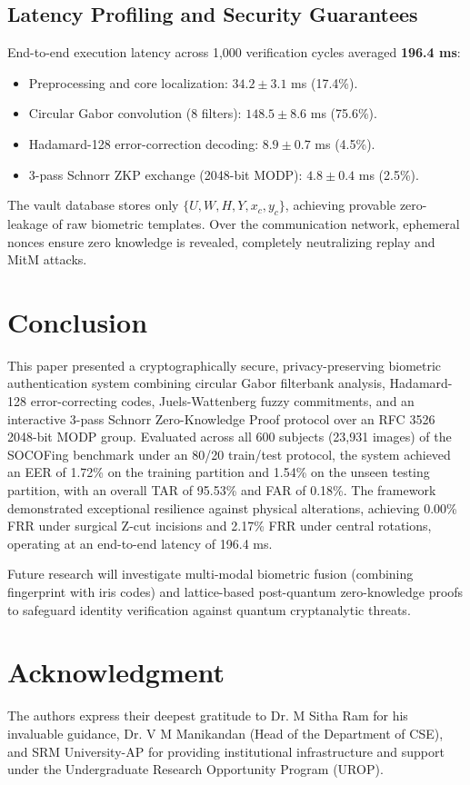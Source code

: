 \documentclass[conference]{IEEEtran}
\begin{document}
\subsection{Latency Profiling and Security Guarantees}
End-to-end execution latency across 1,000 verification cycles averaged \textbf{196.4 ms}:
\begin{itemize}[leftmargin=*, itemsep=2pt]
    \item Preprocessing and core localization: $34.2 \pm 3.1$ ms (17.4\%).
    \item Circular Gabor convolution (8 filters): $148.5 \pm 8.6$ ms (75.6\%).
    \item Hadamard-128 error-correction decoding: $8.9 \pm 0.7$ ms (4.5\%).
    \item 3-pass Schnorr ZKP exchange (2048-bit MODP): $4.8 \pm 0.4$ ms (2.5\%).
\end{itemize}
The vault database stores only $\{U, W, H, Y, x_c, y_c\}$, achieving provable zero-leakage of raw biometric templates. Over the communication network, ephemeral nonces ensure zero knowledge is revealed, completely neutralizing replay and MitM attacks.

\section{Conclusion}
This paper presented a cryptographically secure, privacy-preserving biometric authentication system combining circular Gabor filterbank analysis, Hadamard-128 error-correcting codes, Juels-Wattenberg fuzzy commitments, and an interactive 3-pass Schnorr Zero-Knowledge Proof protocol over an RFC 3526 2048-bit MODP group. Evaluated across all 600 subjects (23,931 images) of the SOCOFing benchmark under an 80/20 train/test protocol, the system achieved an EER of 1.72\% on the training partition and 1.54\% on the unseen testing partition, with an overall TAR of 95.53\% and FAR of 0.18\%. The framework demonstrated exceptional resilience against physical alterations, achieving 0.00\% FRR under surgical Z-cut incisions and 2.17\% FRR under central rotations, operating at an end-to-end latency of 196.4 ms.

Future research will investigate multi-modal biometric fusion (combining fingerprint with iris codes) and lattice-based post-quantum zero-knowledge proofs to safeguard identity verification against quantum cryptanalytic threats.

\section*{Acknowledgment}
The authors express their deepest gratitude to Dr. M Sitha Ram for his invaluable guidance, Dr. V M Manikandan (Head of the Department of CSE), and SRM University-AP for providing institutional infrastructure and support under the Undergraduate Research Opportunity Program (UROP).

\balance


\end{document}
